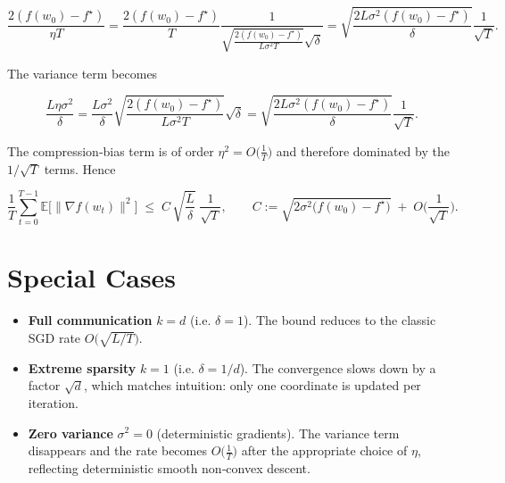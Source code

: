 \documentclass{article}
\begin{document}
\[
\frac{2(f(w_0)-f^{\star})}{\eta T}
   = \frac{2(f(w_0)-f^{\star})}{T}
     \frac{1}{\sqrt{\frac{2(f(w_0)-f^{\star})}{L\sigma^{2}T}}\sqrt{\delta}}
   = \sqrt{\frac{2L\sigma^{2}(f(w_0)-f^{\star})}{\delta}}\frac{1}{\sqrt{T}}.
\]

The variance term becomes  

\[
\frac{L\eta\sigma^{2}}{\delta}
 = \frac{L\sigma^{2}}{\delta}
   \sqrt{\frac{2(f(w_0)-f^{\star})}{L\sigma^{2}T}}\sqrt{\delta}
 = \sqrt{\frac{2L\sigma^{2}(f(w_0)-f^{\star})}{\delta}}\frac{1}{\sqrt{T}} .
\]

The compression‑bias term is of order $\eta^{2}=O\!\big(\frac{1}{T}\big)$ and therefore dominated by the $1/\sqrt{T}$ terms. Hence

\[
\frac{1}{T}\sum_{t=0}^{T-1}\mathbb{E}\!\big[\|\nabla f(w_t)\|^{2}\big]
\;\le\;
C\,\sqrt{\frac{L}{\delta}}\;\frac{1}{\sqrt{T}},
\qquad
C:=\sqrt{2\sigma^{2}\big(f(w_0)-f^{\star}\big)}\;+\;O\!\big(\frac{1}{\sqrt{T}}\big).
\]

\section*{Special Cases}
\begin{itemize}
    \item \textbf{Full communication} $k=d$ (i.e. $\delta=1$). The bound reduces to the classic SGD rate $O\!\big(\sqrt{L/T}\big)$.
    \item \textbf{Extreme sparsity} $k=1$ (i.e. $\delta=1/d$). The convergence slows down by a factor $\sqrt{d}$, which matches intuition: only one coordinate is updated per iteration.
    \item \textbf{Zero variance} $\sigma^{2}=0$ (deterministic gradients). The variance term disappears and the rate becomes $O\!\big(\frac{1}{T}\big)$ after the appropriate choice of $\eta$, reflecting deterministic smooth non‑convex descent.
\end{itemize}
\end{document}
